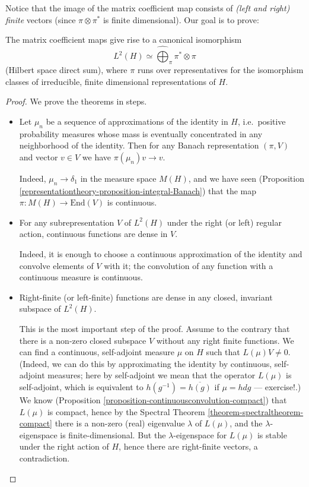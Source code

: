 Notice that the image of the matrix coefficient map consists of \emph{(left and right) finite} vectors (since $\pi\otimes\pi^*$ is finite dimensional). Our goal is to prove:

\begin{theorem}
\label{theorem-PeterWeyl}
The matrix coefficient maps give rise to a canonical isomorphism
$$L^2(H)\simeq \hat\bigoplus_\pi \pi^*\otimes \pi$$
(Hilbert space direct sum),
where $\pi$ runs over representatives for the isomorphism classes of irreducible, finite dimensional representations of $H$.
\end{theorem}

\begin{proof}
 We prove the theorems in steps. 

\begin{itemize}
 \item Let $\mu_n$ be a sequence of approximations of the identity in $H$, i.e.\ positive probability measures whose mass is eventually concentrated in any neighborhood of the identity. Then for any Banach representation $(\pi,V)$ and vector $v\in V$ we have $\pi(\mu_n)v\to v$.
 
 Indeed, $\mu_n\to \delta_1$ in the measure space $M(H)$, and we have seen (Proposition \ref{representationtheory-proposition-integral-Banach}) that the map $\pi: M(H)\to \text{End}(V)$ is continuous.

 
 \item For any subrepresentation $V$ of $L^2(H)$ under the right (or left) regular action, continuous functions are dense in $V$. 

Indeed, it is enough to choose a continuous approximation of the identity and convolve elements of $V$ with it; the convolution of any function with a continuous measure is continuous.

\item Right-finite (or left-finite) functions are dense in any closed, invariant subspace of $L^2(H)$. 

This is the most important step of the proof. Assume to the contrary that there is a non-zero closed subspace $V$ without any right finite functions. We can find a continuous, self-adjoint measure $\mu$ on $H$ such that $L(\mu)V\ne 0$. (Indeed, we can do this by approximating the identity by continuous, self-adjoint measures; here by self-adjoint we mean that the operator $L(\mu)$ is self-adjoint, which is equivalent to $h(g^{-1})=\overline{h(g)}$ if $\mu=hdg$ --- exercise!.) We know (Proposition \ref{proposition-continuousconvolution-compact}) that $L(\mu)$ is compact, hence by the Spectral Theorem \ref{theorem-spectraltheorem-compact} there is a non-zero (real) eigenvalue $\lambda$ of $L(\mu)$, and the $\lambda$-eigenspace is finite-dimensional. But the $\lambda$-eigenspace for $L(\mu)$ is stable under the right action of $H$, hence there are right-finite vectors, a contradiction.


\end{itemize}
\end{proof}

